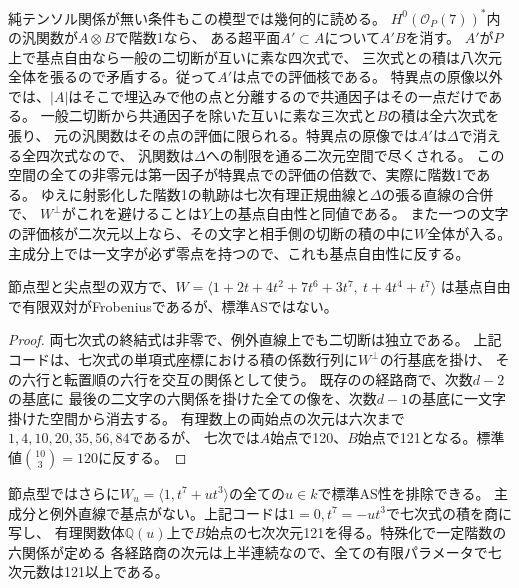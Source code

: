 純テンソル関係が無い条件もこの模型では幾何的に読める。
$H^0(\mathcal O_P(7))^*$内の汎関数が$A\otimes B$で階数1なら、
ある超平面$A'\subset A$について$A' B$を消す。
$A'$が$P$上で基点自由なら一般の二切断が互いに素な四次式で、
三次式との積は八次元全体を張るので矛盾する。従って$A'$は点での評価核である。
特異点の原像以外では、$|A|$はそこで埋込みで他の点と分離するので共通因子はその一点だけである。
一般二切断から共通因子を除いた互いに素な三次式と$B$の積は全六次式を張り、
元の汎関数はその点の評価に限られる。特異点の原像では$A'$は$\Delta$で消える全四次式なので、
汎関数は$\Delta$への制限を通る二次元空間で尽くされる。
この空間の全ての非零元は第一因子が特異点での評価の倍数で、実際に階数1である。
ゆえに射影化した階数1の軌跡は七次有理正規曲線と$\Delta$の張る直線の合併で、
$W^\perp$がこれを避けることは$Y$上の基点自由性と同値である。
また一つの文字の評価核が二次元以上なら、その文字と相手側の切断の積の中に$W$全体が入る。
主成分上では一文字が必ず零点を持つので、これも基点自由性に反する。

\begin{corollary}[七次で排除される二つの鉛筆]\label{cor:conductor-degree-seven}
節点型と尖点型の双方で、$W=\langle1+2t+4t^2+7t^6+3t^7,\ t+4t^4+t^7\rangle$
は基点自由で有限双対がFrobeniusであるが、標準ASではない。
\end{corollary}
\begin{proof}
両七次式の終結式は非零で、例外直線上でも二切断は独立である。
上記コードは、七次式の単項式座標における積の係数行列に$W^\perp$の行基底を掛け、
その六行と転置順の六行を交互の関係として使う。
既存のの経路商で、次数$d-2$の基底に
最後の二文字の六関係を掛けた全ての像を、次数$d-1$の基底に一文字掛けた空間から消去する。
有理数上の両始点の次元は六次まで$1,4,10,20,35,56,84$であるが、
七次では$A$始点で120、$B$始点で121となる。標準値$\binom{10}{3}=120$に反する。
\end{proof}

節点型ではさらに$W_u=\langle1,t^7+u t^3\rangle$の全ての$u\in k$で標準AS性を排除できる。
主成分と例外直線で基点がない。上記コードは$1=0,t^7=-u t^3$で七次式の積を商に写し、
有理関数体$\mathbb Q(u)$上で$B$始点の七次次元121を得る。特殊化で一定階数の六関係が定める
各経路商の次元は上半連続なので、全ての有限パラメータで七次元数は121以上である。
